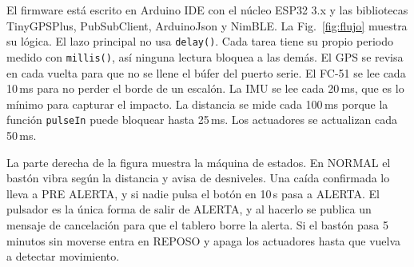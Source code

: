 \documentclass[conference,a4paper]{IEEEtran}
\begin{document}
El firmware está escrito en Arduino IDE con el núcleo ESP32 3.x y las bibliotecas TinyGPSPlus, PubSubClient, ArduinoJson y NimBLE. La Fig.~\ref{fig:flujo} muestra su lógica. El lazo principal no usa \texttt{delay()}. Cada tarea tiene su propio periodo medido con \texttt{millis()}, así ninguna lectura bloquea a las demás. El GPS se revisa en cada vuelta para que no se llene el búfer del puerto serie. El FC-51 se lee cada 10\,ms para no perder el borde de un escalón. La IMU se lee cada 20\,ms, que es lo mínimo para capturar el impacto. La distancia se mide cada 100\,ms porque la función \texttt{pulseIn} puede bloquear hasta 25\,ms. Los actuadores se actualizan cada 50\,ms.

La parte derecha de la figura muestra la máquina de estados. En NORMAL el bastón vibra según la distancia y avisa de desniveles. Una caída confirmada lo lleva a PRE ALERTA, y si nadie pulsa el botón en 10\,s pasa a ALERTA. El pulsador es la única forma de salir de ALERTA, y al hacerlo se publica un mensaje de cancelación para que el tablero borre la alerta. Si el bastón pasa 5 minutos sin moverse entra en REPOSO y apaga los actuadores hasta que vuelva a detectar movimiento.
\end{document}
